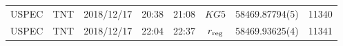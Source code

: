 \begin{table}
\begin{center}
\begin{tabular}{cccccccc}
			USPEC & TNT     & 2018/12/17 & 20:38 & 21:08 & $KG5$                                 & 58469.87794(5)                                                                                                            &                                       11340 \\
			USPEC & TNT     & 2018/12/17 & 22:04 & 22:37 & $r_{\rm reg}$                         & 58469.93625(4)                                                                                                            &                                       11341 \\
		   \hline
		\end{tabular}
	\end{center}
\end{table}